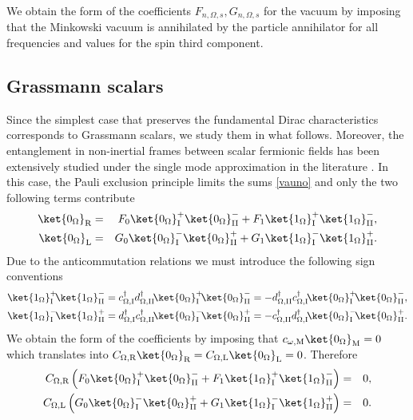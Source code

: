 We obtain the form of the coefficients $F_{n,\Omega,s},G_{n,\Omega,s}$ for the vacuum by imposing that the Minkowski vacuum is annihilated by the particle annihilator for all frequencies and values for the spin third component.


\subsection{Grassmann scalars}

Since the simplest case that preserves the fundamental Dirac characteristics corresponds to Grassmann scalars, we study them in what follows. Moreover,  the entanglement in non-inertial frames between scalar fermionic fields has been extensively studied under the single mode approximation in the literature \cite{AlsingSchul}. In this case, the Pauli exclusion principle limits the sums \eqref{vauno} and only the two following terms contribute
\begin{eqnarray}
\label{vaunos}
\ket{0_\Omega}_\text{\text{R}}&=&F_0\ket{0_\Omega}^+_\text{I}\ket{0_\Omega}^-_\text{II}+F_1\ket{1_\Omega}^+_\text{I}\ket{1_\Omega}^-_\text{II},\nonumber \\
\ket{0_\Omega}_\text{\text{L}}&=&G_0\ket{0_\Omega}^-_\text{I}\ket{0_\Omega}^+_\text{II}+G_1\ket{1_\Omega}^-_\text{I}\ket{1_\Omega}^+_\text{II}.
\end{eqnarray}
Due to the anticommutation relations we must introduce the following sign conventions
\begin{align}
\ket{1_\Omega}^+_\text{I}\!\ket{1_\Omega}^-_\text{II}&=c^\dagger_{\Omega,\text{I}}d^\dagger_{\Omega,\text{II}}\!\ket{0_\Omega}^+_\text{I}\!\ket{0_\Omega}^-_\text{II}=-d^\dagger_{\Omega,\text{II}}c^\dagger_{\Omega,\text{I}}\!\ket{0_\Omega}^+_\text{I}\!\ket{0_\Omega}^-_\text{II},\nonumber\\*
\ket{1_\Omega}^-_\text{I}\!\ket{1_\Omega}^+_\text{II}&=d^\dagger_{\Omega,\text{I}}c^\dagger_{\Omega,\text{II}}\!\ket{0_\Omega}^-_\text{I}\!\ket{0_\Omega}^+_\text{II}=-c^\dagger_{\Omega,\text{II}}d^\dagger_{\Omega,\text{I}}\!\ket{0_\Omega}^-_\text{I}\!\ket{0_\Omega}^+_\text{II}.
\end{align}
We obtain the form of the coefficients by imposing that $c_{\omega,\text{M}}\ket{0_\Omega}_\text{M}=0$ which translates into $C_{\Omega,\text{\text{R}}}\ket{0_\Omega}_\text{\text{R}}=C_{\Omega,\text{\text{L}}}\ket{0_\Omega}_\text{\text{L}}=0$. Therefore
\begin{eqnarray}
\label{co1} C_{\Omega,\text{\text{R}}}\left(F_0\ket{0_\Omega}^+_\text{I}\ket{0_\Omega}^-_\text{II}+F_1\ket{1_\Omega}^+_\text{I}\ket{1_\Omega}^-_\text{II}\right)&=&0,\nonumber \\
\label{co2} C_{\Omega,\text{\text{L}}}\left(G_0\ket{0_\Omega}^-_\text{I}\ket{0_\Omega}^+_\text{II}+G_1\ket{1_\Omega}^-_\text{I}\ket{1_\Omega}^+_\text{II}\right)&=&0.
\end{eqnarray}
